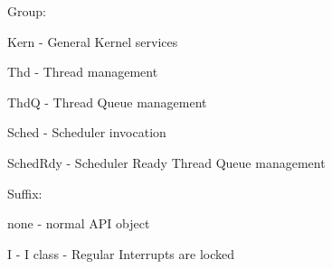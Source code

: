 \begin{DoxyItemize}
\item Group\-:
\begin{DoxyItemize}
\item {\ttfamily Kern} -\/ General Kernel services
\item {\ttfamily Thd} -\/ Thread management
\item {\ttfamily Thd\-Q} -\/ Thread Queue management
\item {\ttfamily Sched} -\/ Scheduler invocation
\item {\ttfamily Sched\-Rdy} -\/ Scheduler Ready Thread Queue management
\end{DoxyItemize}
\item Suffix\-:
\begin{DoxyItemize}
\item {\ttfamily none} -\/ normal A\-P\-I object
\item {\ttfamily I} -\/ I class -\/ Regular Interrupts are locked
\end{DoxyItemize}
\end{DoxyItemize}

